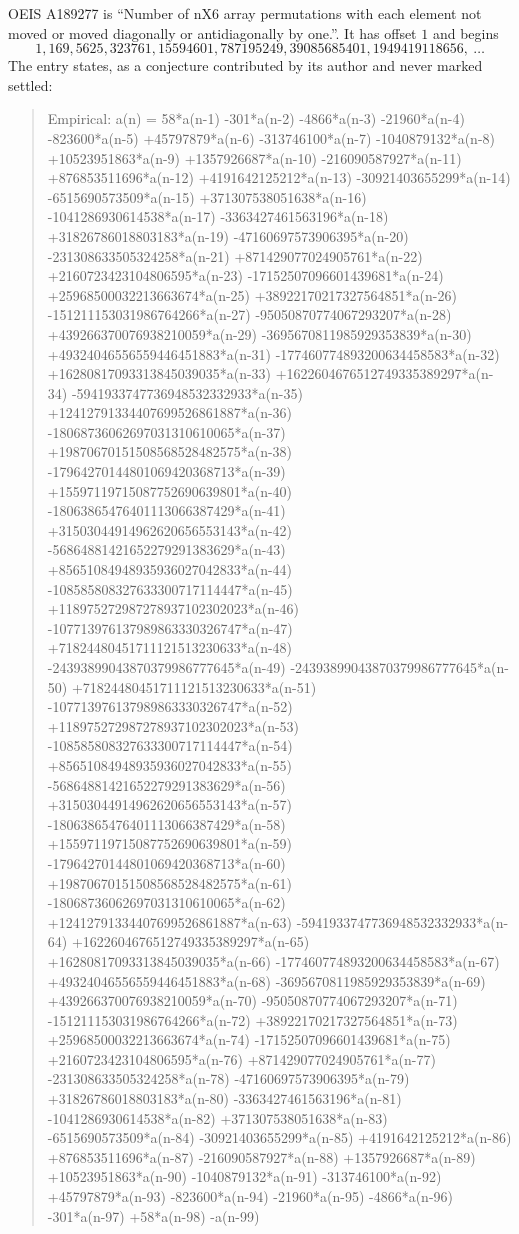 \documentclass[11pt,a4paper]{article}
\theoremstyle{plain}
\theoremstyle{definition}
\begin{document}
OEIS A189277 is ``Number of nX6 array permutations with each element not moved or moved diagonally or antidiagonally by one.''. It has offset $1$ and begins
\[
1, 169, 5625, 323761, 15594601, 787195249, 39085685401, 1949419118656,\ \dots
\]
The entry states, as a conjecture contributed by its author and never marked settled:
\begin{quote}
Empirical: a(n) = 58*a(n-1) -301*a(n-2) -4866*a(n-3) -21960*a(n-4) -823600*a(n-5) +45797879*a(n-6) -313746100*a(n-7) -1040879132*a(n-8) +10523951863*a(n-9) +1357926687*a(n-10) -216090587927*a(n-11) +876853511696*a(n-12) +4191642125212*a(n-13) -30921403655299*a(n-14) -6515690573509*a(n-15) +371307538051638*a(n-16) -1041286930614538*a(n-17) -3363427461563196*a(n-18) +31826786018803183*a(n-19) -47160697573906395*a(n-20) -231308633505324258*a(n-21) +871429077024905761*a(n-22) +2160723423104806595*a(n-23) -17152507096601439681*a(n-24) +25968500032213663674*a(n-25) +38922170217327564851*a(n-26) -151211153031986764266*a(n-27) -95050870774067293207*a(n-28) +439266370076938210059*a(n-29) -3695670811985929353839*a(n-30) +49324046556559446451883*a(n-31) -177460774893200634458583*a(n-32) +16280817093313845039035*a(n-33) +1622604676512749335389297*a(n-34) -5941933747736948532332933*a(n-35) +12412791334407699526861887*a(n-36) -18068736062697031310610065*a(n-37) +19870670151508568528482575*a(n-38) -17964270144801069420368713*a(n-39) +15597119715087752690639801*a(n-40) -18063865476401113066387429*a(n-41) +31503044914962620656553143*a(n-42) -56864881421652279291383629*a(n-43) +85651084948935936027042833*a(n-44) -108585808327633300717114447*a(n-45) +118975272987278937102302023*a(n-46) -107713976137989863330326747*a(n-47) +71824480451711121513230633*a(n-48) -24393899043870379986777645*a(n-49) -24393899043870379986777645*a(n-50) +71824480451711121513230633*a(n-51) -107713976137989863330326747*a(n-52) +118975272987278937102302023*a(n-53) -108585808327633300717114447*a(n-54) +85651084948935936027042833*a(n-55) -56864881421652279291383629*a(n-56) +31503044914962620656553143*a(n-57) -18063865476401113066387429*a(n-58) +15597119715087752690639801*a(n-59) -17964270144801069420368713*a(n-60) +19870670151508568528482575*a(n-61) -18068736062697031310610065*a(n-62) +12412791334407699526861887*a(n-63) -5941933747736948532332933*a(n-64) +1622604676512749335389297*a(n-65) +16280817093313845039035*a(n-66) -177460774893200634458583*a(n-67) +49324046556559446451883*a(n-68) -3695670811985929353839*a(n-69) +439266370076938210059*a(n-70) -95050870774067293207*a(n-71) -151211153031986764266*a(n-72) +38922170217327564851*a(n-73) +25968500032213663674*a(n-74) -17152507096601439681*a(n-75) +2160723423104806595*a(n-76) +871429077024905761*a(n-77) -231308633505324258*a(n-78) -47160697573906395*a(n-79) +31826786018803183*a(n-80) -3363427461563196*a(n-81) -1041286930614538*a(n-82) +371307538051638*a(n-83) -6515690573509*a(n-84) -30921403655299*a(n-85) +4191642125212*a(n-86) +876853511696*a(n-87) -216090587927*a(n-88) +1357926687*a(n-89) +10523951863*a(n-90) -1040879132*a(n-91) -313746100*a(n-92) +45797879*a(n-93) -823600*a(n-94) -21960*a(n-95) -4866*a(n-96) -301*a(n-97) +58*a(n-98) -a(n-99)
\end{quote}
\end{document}
